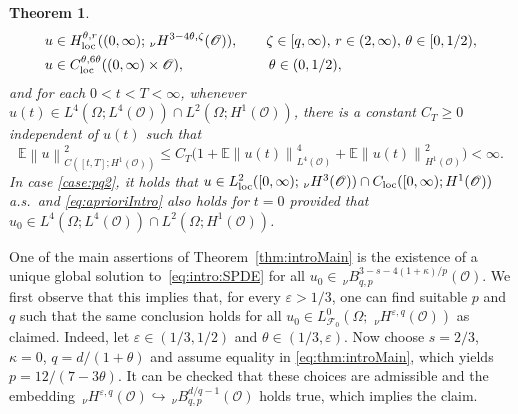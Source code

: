 \documentclass[reqno]{amsart}
\newtheorem{theorem}[Satz]{Theorem}
\newcommand{\E}{\mathbb{E}}
\newcommand{\F}{\mathscr{F}}
\newcommand{\sO}{\mathscr{O}}
\newcommand{\1}{\mathbf{1}}
\newcommand{\loc}{\textup{loc}}
\newcommand{\nH}{\ensuremath{\,_\nu H}}
\newcommand{\nrm}[1]{\left\lVert #1 \right\rVert}
\begin{document}
\begin{theorem}
    \begin{align*}
				u&\in H^{\theta,r}_{\loc}((0,\infty); \nH^{3-4\theta,\zeta}(\sO)),  \qquad \zeta\in [q,\infty),\, r\in (2,\infty),\, \theta\in [0,1/2),\\
                u&\in C_{\loc}^{\theta,6\theta}((0,\infty)\times \sO), \qquad\qquad\qquad\theta\in (0,1/2),
			\end{align*}
   and for each $0<t<T<\infty$,  whenever $u(t)\in L^4(\Omega;L^4(\sO))\cap L^2(\Omega;H^1(\sO))$, there is a constant $C_T\ge 0$ independent of $u(t)$ such that 
    \begin{equation}
    \label{eq:aprioriIntro}
        \E\nrm{u}^2_{C([t,T];H^1(\sO))}\le  C_{T} \big(1+\E\nrm{u(t)}_{L^4(\sO)}^4+\E\nrm{u(t)}_{H^1(\sO)}^2\big)<\infty.
    \end{equation}
    In case \ref{case:pq2}, it holds that $u\in L_\loc^2([0,\infty);\nH^3(\sO))\cap C_\loc([0,\infty);H^1(\sO))$ a.s.\ and \eqref{eq:aprioriIntro} also holds for $t=0$ provided that $u_0\in L^4(\Omega;L^4(\sO))\cap L^2(\Omega;H^1(\sO))$.
\end{theorem}
One of the main assertions of Theorem~\ref{thm:introMain} is the existence of a unique global solution to~\eqref{eq:intro:SPDE} for all $u_0\in\,_\nu B_{q,p}^{3-s-4(1+\kappa)/p}(\sO)$. 
We first observe that this implies that, for every $\varepsilon>1/3$, one can find suitable $p$ and $q$ such that the same conclusion holds for all $u_0\in L_{\F_0}^0(\Omega;\, \nH^{\varepsilon, q}(\sO))$ as claimed. Indeed, let $\varepsilon \in (1/3, 1/2)$ and $\theta \in (1/3, \varepsilon)$. Now choose $s=2/3$, $\kappa = 0$, $q = d/(1+\theta)$ and assume equality in \eqref{eq:thm:introMain}, which yields $p=12/(7-3\theta)$. It can be checked that these choices are admissible and the embedding $\nH^{\varepsilon, q}(\sO) \hookrightarrow\,_\nu B^{d/q-1}_{q,p}(\sO)$ holds true, which implies the claim.
\end{document}
